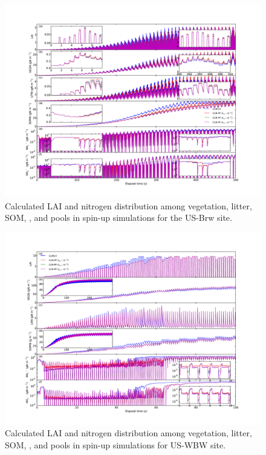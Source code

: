 \documentclass[gmd, manuscript]{copernicus}
\begin{document}
\begin{figure}[t]
\includegraphics[width=18cm]{../figs/fig10/brw500yl.pdf}
\caption{Calculated LAI and nitrogen distribution among vegetation, litter,
SOM, , and  pools in spin-up simulations for the US-Brw
site.}
\label{fig:brw500yl}
\end{figure}

\begin{figure}[t]
\includegraphics[width=18cm]{../figs/fig11/pit300yl.pdf}
\caption{Calculated LAI and nitrogen distribution among vegetation, litter,
SOM, , and  pools in spin-up simulations for US-WBW
site.}
\label{fig:pit300yl}
\end{figure}
\end{document}
